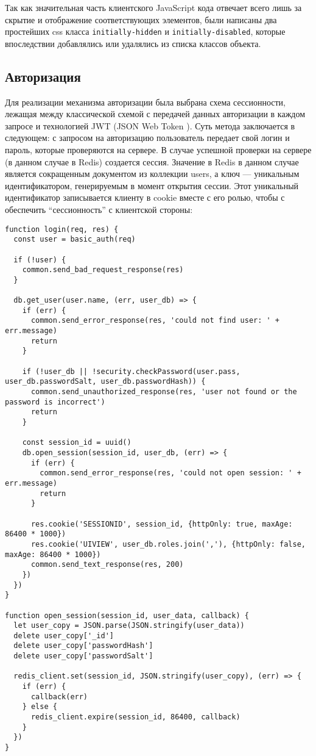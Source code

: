 \documentclass[14pt]{extarticle}
\begin{document}
Так как значительная часть клиентского JavaScript кода отвечает всего лишь за скрытие и отображение соответствующих элементов, были написаны два простейших css класса \texttt{initially-hidden} и \texttt{initially-disabled}, которые впоследствии добавлялись или удалялись из списка классов объекта.

\subsection{Авторизация}
Для реализации механизма авторизации была выбрана схема сессионности, лежащая между классической схемой с передачей данных авторизации в каждом запросе и технологией JWT (JSON Web Token \cite{jwt}). Суть метода заключается в следующем: с запросом на авторизацию пользователь передает свой логин и пароль, которые проверяются на сервере. В случае успешной проверки на сервере (в данном случае в Redis) создается сессия. Значение в Redis в данном случае является сокращенным документом из коллекции users, а ключ --- уникальным идентификатором, генерируемым в момент открытия сессии. Этот уникальный идентификатор записывается клиенту в cookie вместе с его ролью, чтобы с обеспечить \enquote{сессионность} с клиентской стороны:
\begin{lstlisting}
function login(req, res) {
  const user = basic_auth(req)

  if (!user) {
    common.send_bad_request_response(res)
  }

  db.get_user(user.name, (err, user_db) => {
    if (err) {
      common.send_error_response(res, 'could not find user: ' + err.message)
      return
    }

    if (!user_db || !security.checkPassword(user.pass, user_db.passwordSalt, user_db.passwordHash)) {
      common.send_unauthorized_response(res, 'user not found or the password is incorrect')
      return
    }

    const session_id = uuid()
    db.open_session(session_id, user_db, (err) => {
      if (err) {
        common.send_error_response(res, 'could not open session: ' + err.message)
        return
      }

      res.cookie('SESSIONID', session_id, {httpOnly: true, maxAge: 86400 * 1000})
      res.cookie('UIVIEW', user_db.roles.join(','), {httpOnly: false, maxAge: 86400 * 1000})
      common.send_text_response(res, 200)
    })
  })
}

function open_session(session_id, user_data, callback) {
  let user_copy = JSON.parse(JSON.stringify(user_data))
  delete user_copy['_id']
  delete user_copy['passwordHash']
  delete user_copy['passwordSalt']

  redis_client.set(session_id, JSON.stringify(user_copy), (err) => {
    if (err) {
      callback(err)
    } else {
      redis_client.expire(session_id, 86400, callback)
    }
  })
}
\end{lstlisting}
\end{document}
